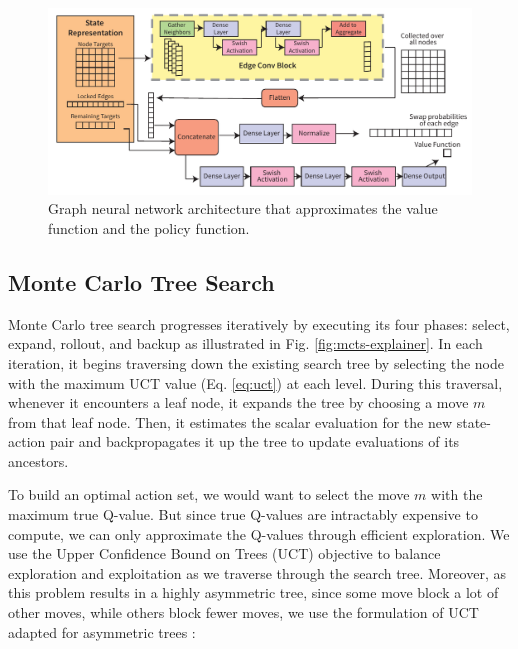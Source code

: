 \begin{figure}[th]
\centering
    \includegraphics[width=\textwidth]{figures/qroute/Architecture.pdf}
    \caption{\label{fig:network-architecture}
     Graph neural network architecture that approximates the value function and the policy function.}
\end{figure}

\subsection{\label{sec:method-mcts} Monte Carlo Tree Search}

Monte Carlo tree search progresses iteratively by executing its four phases: select, expand, rollout, and backup as illustrated in Fig. \ref{fig:mcts-explainer}. In each iteration, it begins traversing down the existing search tree by selecting the node with the maximum UCT value (Eq. \ref{eq:uct}) at each level. During this traversal, whenever it encounters a leaf node, it expands the tree by choosing a move $m$ from that leaf node. Then, it estimates the scalar evaluation for the new state-action pair and backpropagates it up the tree to update evaluations of its ancestors.

To build an optimal action set, we would want to select the move $m$ with the maximum true Q-value. But since true Q-values are intractably expensive to compute, we can only approximate the Q-values through efficient exploration. We use the Upper Confidence Bound on Trees (UCT) objective \cite{mcts_uct} to balance exploration and exploitation as we traverse through the search tree. Moreover, as this problem results in a highly asymmetric tree, since some move block a lot of other moves, while others block fewer moves, we use the formulation of UCT adapted for asymmetric trees \cite{mcts_assymetric}:

